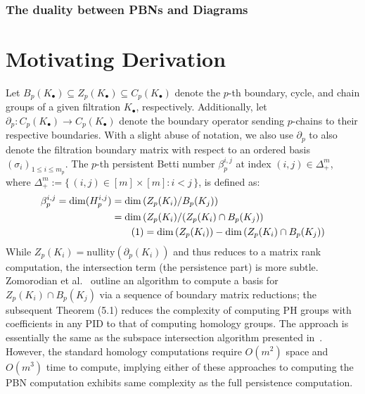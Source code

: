 \documentclass[10pt]{article}
\newcommand{\+}{%
	\raisebox{0.18ex}{\scaleobj{0.55}{+}}
}
\theoremstyle{definition}
\newcommand\numberthis{\addtocounter{equation}{1}\tag{\theequation}}
\begin{document}
\subsubsection*{The duality between PBNs and Diagrams}



\section{Motivating Derivation}\label{sec:betti_derivation}

Let $B_p(K_\bullet) \subseteq Z_p(K_\bullet) \subseteq C_p(K_\bullet)$ denote the $p$-th boundary, cycle, and chain groups of a given filtration $K_\bullet$, respectively. 
Additionally, let $\partial_p : C_p( K_{\bullet}) \to C_p(K_{\bullet})$ denote the boundary operator sending $p$-chains to their respective boundaries. 
With a slight abuse of notation, we also use $\partial_p$ to also denote the filtration boundary matrix with respect to an ordered basis $(\sigma_i)_{1 \leq i \leq m_p}$.
The $p$-th persistent Betti number $\beta_p^{i,j}$ at index $(i,j) \in \Delta_+^m$, where $\Delta_+^m  := \{ \, (i,j) \in [m] \times [m] : i < j \, \}$, is defined as: 
\begin{align*} \label{eq:pbn}
	\centering
	\beta_p^{i,j} = \mathrm{dim}(H_p^{i,j}) &= \mathrm{dim} \left ( Z_p(K_i) / B_p(K_j) \right ) \\
	& = \mathrm{dim} \left( Z_p(K_i) / (Z_p(K_i) \cap B_p(K_j) \right) \\
	& \numberthis = \mathrm{dim} \left( Z_p(K_i) \right) - \mathrm{dim}\left( Z_p(K_i) \cap B_p(K_j) \right ) 
\end{align*}
While $Z_p(K_i) = \mathrm{nullity}(\partial_p(K_i))$ and thus reduces to a matrix rank computation, the intersection term (the persistence part) is more subtle. Zomorodian et al.~\cite{zomorodian2004computing} outline an algorithm to compute a basis for $Z_p(K_i) \cap B_p(K_j)$ via a sequence of boundary matrix reductions; the subsequent Theorem (5.1) reduces the complexity of computing PH groups with coefficients in any PID to that of computing homology groups. The approach is essentially the same as the subspace intersection algorithm presented in~\cite{}.
However, the standard homology computations require $O(m^2)$ space and $O(m^3)$ time to compute, implying either of these approaches to computing the PBN computation exhibits same complexity as the full persistence computation.
\end{document}
